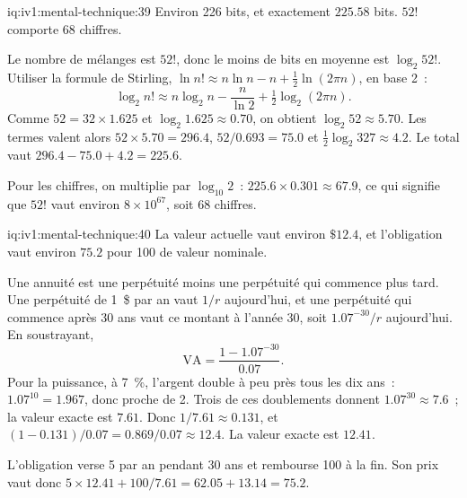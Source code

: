 \begin{solution}{iq:iv1:mental-technique:39}
Environ 226 bits, et exactement $225.58$ bits. $52!$ comporte 68 chiffres.

Le nombre de mélanges est $52!$, donc le moins de bits en moyenne est $\log_2 52!$. Utiliser la formule de Stirling, $\ln n! \approx n \ln n - n + \tfrac12 \ln(2\pi n)$, en base 2~:
\[
\log_2 n! \approx n \log_2 n - \frac{n}{\ln 2} + \tfrac12 \log_2 (2\pi n).
\]
Comme $52 = 32 \times 1.625$ et $\log_2 1.625 \approx 0.70$, on obtient $\log_2 52 \approx 5.70$. Les termes valent alors $52 \times 5.70 = 296.4$, $52/0.693 = 75.0$ et $\tfrac12 \log_2 327 \approx 4.2$. Le total vaut $296.4 - 75.0 + 4.2 = 225.6$.

Pour les chiffres, on multiplie par $\log_{10} 2$~: $225.6 \times 0.301 \approx 67.9$, ce qui signifie que $52!$ vaut environ $8 \times 10^{67}$, soit 68 chiffres.

\end{solution}

\begin{solution}{iq:iv1:mental-technique:40}
La valeur actuelle vaut environ $\$12.4$, et l'obligation vaut environ $75.2$ pour 100 de valeur nominale.

Une annuité est une perpétuité moins une perpétuité qui commence plus tard. Une perpétuité de 1~\$ par an vaut $1/r$ aujourd'hui, et une perpétuité qui commence après 30 ans vaut ce montant à l'année 30, soit $1.07^{-30}/r$ aujourd'hui. En soustrayant,
\[
\text{VA} = \frac{1 - 1.07^{-30}}{0.07}.
\]
Pour la puissance, à 7~\%, l'argent double à peu près tous les dix ans~: $1.07^{10} = 1.967$, donc proche de 2. Trois de ces doublements donnent $1.07^{30} \approx 7.6$~; la valeur exacte est $7.61$. Donc $1/7.61 \approx 0.131$, et $(1 - 0.131)/0.07 = 0.869/0.07 \approx 12.4$. La valeur exacte est $12.41$.

L'obligation verse 5 par an pendant 30 ans et rembourse 100 à la fin. Son prix vaut donc $5 \times 12.41 + 100/7.61 = 62.05 + 13.14 = 75.2$.

\end{solution}

